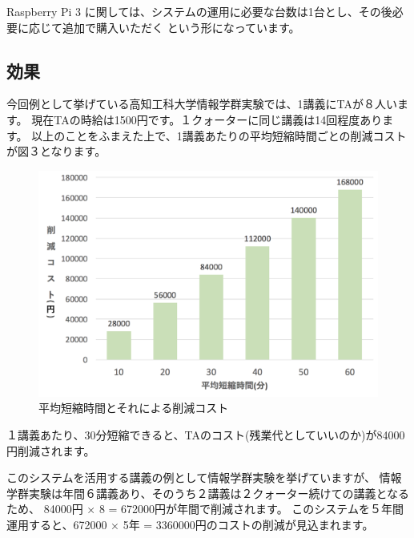 \documentclass[a4j,titlepage]{ujarticle}
\begin{document}
Raspberry Pi 3 に関しては、システムの運用に必要な台数は1台とし、その後必要に応じて追加で購入いただく
という形になっています。

\subsection{効果}
今回例として挙げている高知工科大学情報学群実験では、1講義にTAが８人います。
現在TAの時給は1500円です。１クォーターに同じ講義は14回程度あります。
以上のことをふまえた上で、1講義あたりの平均短縮時間ごとの削減コストが図３となります。
\begin{figure}[h]

\centering
   \includegraphics[width=13cm]{sisan.png}
  \caption{平均短縮時間とそれによる削減コスト}
\end{figure}


１講義あたり、30分短縮できると、TAのコスト(残業代としていいのか)が84000円削減されます。


このシステムを活用する講義の例として情報学群実験を挙げていますが、
情報学群実験は年間６講義あり、そのうち２講義は２クォーター続けての講義となるため、 84000円 × 8 = 672000円が年間で削減されます。
このシステムを５年間運用すると、672000 × 5年 = 3360000円のコストの削減が見込まれます。
\end{document}
